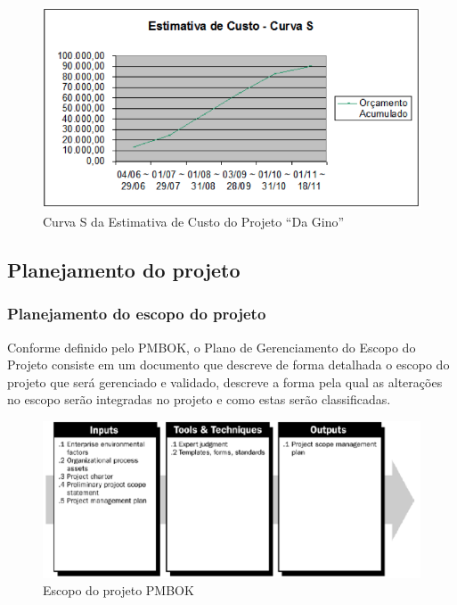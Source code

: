 \begin{figure}[H]
  \centering
  \includegraphics[width=1\textwidth]{softwareengineer/images/pmbok-s-curve} 
  \caption{Curva S da Estimativa de Custo do Projeto “Da Gino”}
  \label{fig:pmbok-s-curve} 
\end{figure}




\subsection{Planejamento do projeto}

\subsubsection{Planejamento do escopo do projeto}

Conforme definido pelo PMBOK, o Plano de Gerenciamento do Escopo do Projeto consiste em um documento que descreve de forma detalhada o escopo do projeto que será gerenciado e validado, descreve a forma pela qual as alterações no escopo serão integradas no projeto e como estas serão classificadas.

\begin{figure}[H]
  \centering
  \includegraphics[width=1\textwidth]{softwareengineer/images/pmbok-scope} 
  \caption{Escopo do projeto PMBOK}
  \label{fig:pmbok-scope} 
\end{figure}

